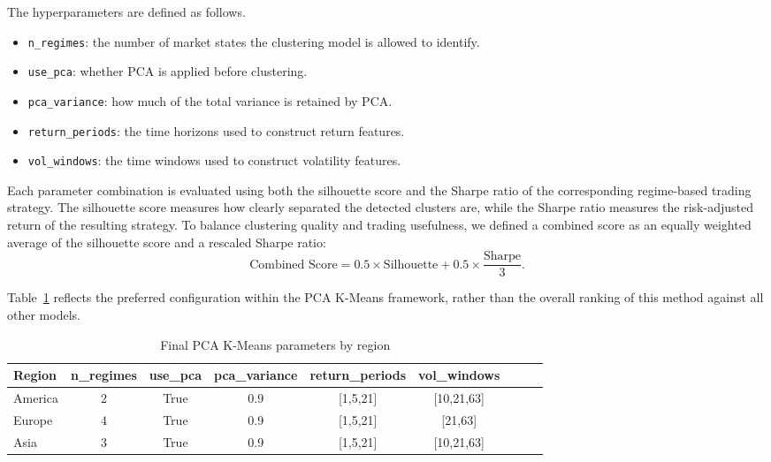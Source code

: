 \documentclass[11pt, a4paper]{article}
\begin{document}
The hyperparameters are defined as follows.

\begin{itemize}[itemsep=0em, topsep=0em]
    \item \texttt{n\_regimes}: the number of market states the clustering model is allowed to identify.
    \item \texttt{use\_pca}: whether PCA is applied before clustering.
    \item \texttt{pca\_variance}: how much of the total variance is retained by PCA.
    \item \texttt{return\_periods}: the time horizons used to construct return features.
    \item \texttt{vol\_windows}: the time windows used to construct volatility features.
\end{itemize}

Each parameter combination is evaluated using both the silhouette score and the Sharpe ratio of the corresponding regime-based trading strategy. The silhouette score measures how clearly separated the detected clusters are, while the Sharpe ratio measures the risk-adjusted return of the resulting strategy.
To balance clustering quality and trading usefulness, we defined a combined score as an equally weighted average of the silhouette score and a rescaled Sharpe ratio:
\begin{equation}
\label{eq:combined_score}
\text{Combined Score}
=
0.5 \times \text{Silhouette}
+
0.5 \times \frac{\text{Sharpe}}{3}.
\end{equation}

Table~\ref{tab:tuning_best_by_region} reflects the preferred configuration within the PCA K-Means framework, rather than the overall ranking of this method against all other models.

\begin{table}[h]
\centering
\caption{Final PCA K-Means parameters by region}
\begin{tabular}{lcccccccc}
\hline
Region & n\_regimes & use\_pca & pca\_variance & return\_periods & vol\_windows \\
\hline
America & 2 & True & 0.9 & [1,5,21] & [10,21,63] \\
Europe  & 4 & True & 0.9 & [1,5,21] & [21,63] \\
Asia    & 3 & True & 0.9 & [1,5,21] & [10,21,63] \\
\hline
\end{tabular}
\label{tab:tuning_best_by_region}
\end{table}
\end{document}
